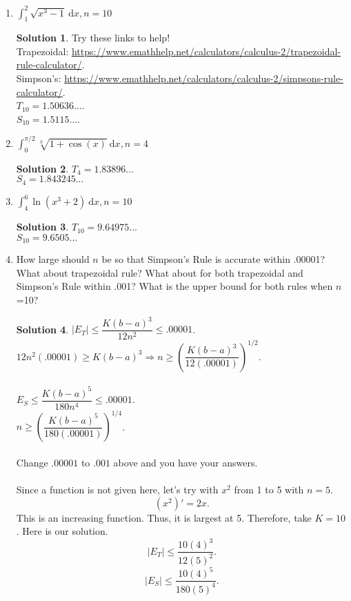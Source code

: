 \documentclass[10pt]{article}
\newcommand{\ds}{\displaystyle}
\newcommand{\dx}{\:\mathrm{d}x}
\theoremstyle{Theorem}
\theoremstyle{definition}
\newtheorem*{solution}{Solution}
\theoremstyle{remark}
\theoremstyle{custom}
\begin{document}
\begin{enumerate}[1.]
\item $\ds\int_1^2 \sqrt{x^3-1}\dx, n=10$
\begin{solution}
Try these links to help! \\
Trapezoidal: \url{https://www.emathhelp.net/calculators/calculus-2/trapezoidal-rule-calculator/}.\\
Simpson's: \url{https://www.emathhelp.net/calculators/calculus-2/simpsons-rule-calculator/}.\\
$T_{10}=1.50636...$.\\
$S_{10}=1.5115...$.
\end{solution}
\item $\ds\int_0^{\pi/2} \sqrt[3]{1+\cos(x)}\dx, n=4$
\begin{solution}
$T_4=1.83896...$\\
$S_4=1.843245...$
\end{solution}
\item $\ds\int^6_4\ln(x^3+2)\dx, n=10$
\begin{solution}
$T_{10}=9.64975...$\\
$S_{10}=9.6505...$
\end{solution}
\item How large should $n$ be so that Simpson's Rule is accurate within .00001? What about trapezoidal rule? What about for both trapezoidal and Simpson's Rule within .001? What is the upper bound for both rules when $n$=10?
\begin{solution}
$|E_T|\leq \dfrac{K(b-a)^3}{12n^2}\leq .00001$.\\
$12n^2 (.00001)\geq K(b-a)^3 \Rightarrow n\geq \left(\dfrac{K(b-a)^3}{12(.00001)}\right)^{1/2}$.\\\\
$E_S\leq \dfrac{K(b-a)^5}{180n^4}\leq .00001$.\\
$n\geq \left(\dfrac{K(b-a)^5}{180(.00001)}\right)^{1/4}$.\\\\
Change $.00001$ to $.001$ above and you have your answers.\\\\
Since a function is not given here, let's try with $x^2$ from 1 to 5 with $n=5$.\\
\[
(x^2)'=2x.
\]
This is an increasing function. Thus, it is largest at 5. Therefore, take $K=10$. Here is our solution.
\[
|E_T|\leq \dfrac{10(4)^3}{12(5)^2}.
\]
\[
|E_S|\leq \dfrac{10(4)^5}{180(5)^4}.
\]
\end{solution}
\end{enumerate}
\end{document}
